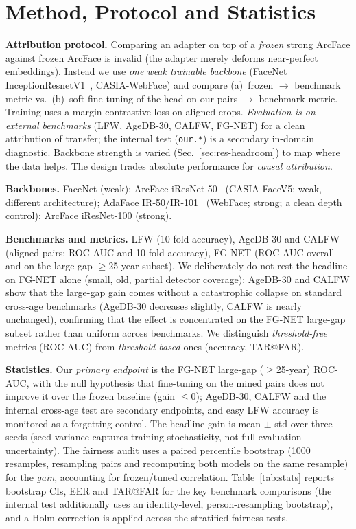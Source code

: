 \documentclass[journal]{IEEEtran}
\begin{document}
\section{Method, Protocol and Statistics}\label{sec:method}
\textbf{Attribution protocol.} Comparing an adapter on top of a \emph{frozen} strong ArcFace against frozen ArcFace is invalid (the adapter merely deforms near-perfect embeddings). Instead we use \emph{one weak trainable backbone} (FaceNet InceptionResnetV1~\cite{schroff2015facenet}, CASIA-WebFace) and compare (a)~frozen $\rightarrow$ benchmark metric vs.\ (b)~soft fine-tuning of the head on our pairs $\rightarrow$ benchmark metric. Training uses a margin contrastive loss on aligned crops. \emph{Evaluation is on external benchmarks} (LFW, AgeDB-30, CALFW, FG-NET) for a clean attribution of transfer; the internal test (\texttt{our.*}) is a secondary in-domain diagnostic. Backbone strength is varied (Sec.~\ref{sec:res-headroom}) to map where the data helps. The design trades absolute performance for \emph{causal attribution}.

\textbf{Backbones.} FaceNet (weak); ArcFace iResNet-50~\cite{deng2019arcface} (CASIA-FaceV5; weak, different architecture); AdaFace IR-50/IR-101~\cite{kim2022adaface} (WebFace; strong; a clean depth control); ArcFace iResNet-100 (strong).

\textbf{Benchmarks and metrics.} LFW (10-fold accuracy), AgeDB-30 and CALFW (aligned pairs; ROC-AUC and 10-fold accuracy), FG-NET (ROC-AUC overall and on the large-gap $\geq$25-year subset). We deliberately do not rest the headline on FG-NET alone (small, old, partial detector coverage): AgeDB-30 and CALFW show that the large-gap gain comes without a catastrophic collapse on standard cross-age benchmarks (AgeDB-30 decreases slightly, CALFW is nearly unchanged), confirming that the effect is concentrated on the FG-NET large-gap subset rather than uniform across benchmarks. We distinguish \emph{threshold-free} metrics (ROC-AUC) from \emph{threshold-based} ones (accuracy, TAR@FAR).

\textbf{Statistics.} Our \emph{primary endpoint} is the FG-NET large-gap ($\geq$25-year) ROC-AUC, with the null hypothesis that fine-tuning on the mined pairs does not improve it over the frozen baseline (gain $\leq 0$); AgeDB-30, CALFW and the internal cross-age test are secondary endpoints, and easy LFW accuracy is monitored as a forgetting control. The headline gain is mean $\pm$ std over three seeds (seed variance captures training stochasticity, not full evaluation uncertainty). The fairness audit uses a paired percentile bootstrap (1000 resamples, resampling pairs and recomputing both models on the same resample) for the \emph{gain}, accounting for frozen/tuned correlation. Table~\ref{tab:stats} reports bootstrap CIs, EER and TAR@FAR for the key benchmark comparisons (the internal test additionally uses an identity-level, person-resampling bootstrap), and a Holm correction is applied across the stratified fairness tests.
\end{document}
